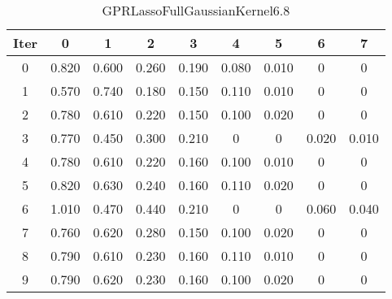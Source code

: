 \begin{table}
	\begin{center}
		\begin{tabular}{|c|c|c|c|c|c|c|c|c|}
			\hline
			Iter & 0 & 1 & 2 & 3 & 4 & 5 & 6 & 7 \\
			\hline
			0 & 0.820 & 0.600 & 0.260 & 0.190 & 0.080 & 0.010 & 0 & 0 \\
			\hline
			1 & 0.570 & 0.740 & 0.180 & 0.150 & 0.110 & 0.010 & 0 & 0 \\
			\hline
			2 & 0.780 & 0.610 & 0.220 & 0.150 & 0.100 & 0.020 & 0 & 0 \\
			\hline
			3 & 0.770 & 0.450 & 0.300 & 0.210 & 0 & 0 & 0.020 & 0.010 \\
			\hline
			4 & 0.780 & 0.610 & 0.220 & 0.160 & 0.100 & 0.010 & 0 & 0 \\
			\hline
			5 & 0.820 & 0.630 & 0.240 & 0.160 & 0.110 & 0.020 & 0 & 0 \\
			\hline
			6 & 1.010 & 0.470 & 0.440 & 0.210 & 0 & 0 & 0.060 & 0.040 \\
			\hline
			7 & 0.760 & 0.620 & 0.280 & 0.150 & 0.100 & 0.020 & 0 & 0 \\
			\hline
			8 & 0.790 & 0.610 & 0.230 & 0.160 & 0.110 & 0.010 & 0 & 0 \\
			\hline
			9 & 0.790 & 0.620 & 0.230 & 0.160 & 0.100 & 0.020 & 0 & 0 \\
			\hline
		\end{tabular}
	\end{center}
	\caption{GPRLassoFullGaussianKernel6.8}
\end{table}